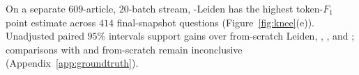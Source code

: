 On a separate $609$-article, $20$-batch stream, \DyLo{}-Leiden has the highest
token-$F_1$ point estimate across $414$ final-snapshot questions
(Figure~\ref{fig:knee}(e)). Unadjusted paired $95\%$ intervals support gains over
from-scratch Leiden, \Batch{}, \DynaMo{}, and \GreMod{}; comparisons with
\QCA{} and from-scratch \Louvain{} remain inconclusive
(Appendix~\ref{app:groundtruth}).

\FloatBarrier
